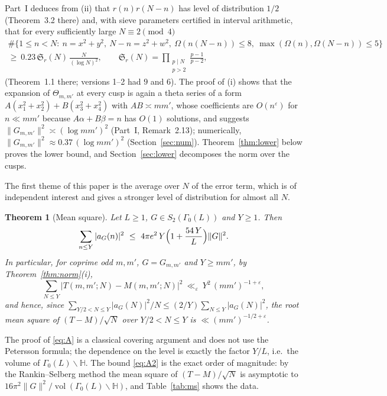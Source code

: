 ﻿\documentclass[11pt]{amsart}
\newtheorem{theorem}{Theorem}[section]
\theoremstyle{remark}
\newcommand{\HH}{\mathbb{H}}
\newcommand{\Sg}{\mathfrak{S}}
\newcommand{\e}{\varepsilon}
\DeclareMathOperator{\vol}{vol}
\begin{document}
Part~I deduces from (ii) that $r(n)r(N-n)$ has level of distribution $1/2$ (Theorem~3.2 there) and, with sieve parameters certified in interval arithmetic, that for every sufficiently large $N\equiv2\pmod4$
\begin{multline*}
\#\bigl\{1\le n<N:\ n=x^2+y^2,\ N-n=z^2+w^2,\ \Omega(n(N-n))\le 8,\ \max(\Omega(n),\Omega(N-n))\le 5\bigr\}\\
\ge\ 0.23\,\Sg_r(N)\,\frac{N}{(\log N)^2},\qquad \Sg_r(N)=\prod_{\substack{p\mid N\\ p>2}}\frac{p-1}{p-2},
\end{multline*}
(Theorem~1.1 there; versions 1--2 had $9$ and $6$). The proof of (i) shows that the expansion of $\Theta_{m,m'}$ at every cusp is again a theta series of a form $A(x_1^2+x_2^2)+B(x_3^2+x_4^2)$ with $AB\asymp mm'$, whose coefficients are $O(n^\e)$ for $n\ll mm'$ because $A\alpha+B\beta=n$ has $O(1)$ solutions, and suggests $\|G_{m,m'}\|^2\asymp(\log mm')^2$ (Part~I, Remark~2.13); numerically, $\|G_{m,m'}\|^2\approx0.37\,(\log mm')^2$ (Section~\ref{sec:num}). Theorem~\ref{thm:lower} below proves the lower bound, and Section~\ref{sec:lower} decomposes the norm over the cusps.

The first theme of this paper is the average over $N$ of the error term, which is of independent interest and gives a stronger level of distribution for almost all $N$.

\begin{theorem}[Mean square]\label{thm:A}
Let $L\ge1$, $G\in S_2(\Gamma_0(L))$ and $Y\ge1$. Then
\begin{equation}\label{eq:A}
\sum_{n\le Y}|a_G(n)|^2\ \le\ 4\pi e^2\,Y\Bigl(1+\frac{54\,Y}{L}\Bigr)\|G\|^2 .
\end{equation}
In particular, for coprime odd $m,m'$, $G=G_{m,m'}$ and $Y\ge mm'$, by Theorem~\ref{thm:norm}(i),
\begin{equation}\label{eq:A2}
\sum_{N\le Y}\bigl|T(m,m';N)-M(m,m';N)\bigr|^2\ \ll_\e\ Y^2\,(mm')^{-1+\e},
\end{equation}
and hence, since $\sum_{Y/2<N\le Y}|a_G(N)|^2/N\le(2/Y)\sum_{N\le Y}|a_G(N)|^2$, the root mean square of $(T-M)/\sqrt N$ over $Y/2<N\le Y$ is $\ll(mm')^{-1/2+\e}$.
\end{theorem}

The proof of \eqref{eq:A} is a classical covering argument and does not use the Petersson formula; the dependence on the level is exactly the factor $Y/L$, i.e.\ the volume of $\Gamma_0(L)\backslash\HH$. The bound \eqref{eq:A2} is the exact order of magnitude: by the Rankin--Selberg method the mean square of $(T-M)/\sqrt N$ is asymptotic to $16\pi^2\|G\|^2/\vol(\Gamma_0(L)\backslash\HH)$, and Table~\ref{tab:ms} shows the data.
\end{document}
